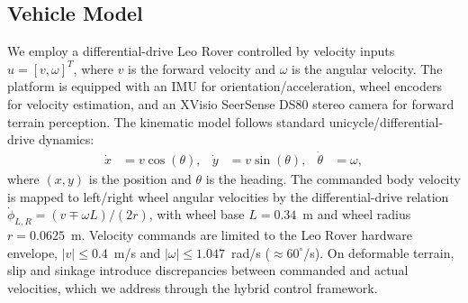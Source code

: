 \documentclass[conference]{IEEEtran}
\begin{document}
\subsection{Vehicle Model}
We employ a differential-drive Leo Rover controlled by velocity inputs $u = [v, \omega]^T$, where $v$ is the forward velocity and $\omega$ is the angular velocity. The platform is equipped with an IMU for orientation/acceleration, wheel encoders for velocity estimation, and an XVisio SeerSense DS80 stereo camera for forward terrain perception. The kinematic model follows standard unicycle/differential-drive dynamics:
\begin{align}
\dot{x} &= v \cos(\theta), &
\dot{y} &= v \sin(\theta), &
\dot{\theta} &= \omega,
\end{align}
where $(x, y)$ is the position and $\theta$ is the heading. The commanded body velocity is mapped to left/right wheel angular velocities by the differential-drive relation $\dot{\phi}_{L,R} = (v \mp \omega L)/(2r)$, with wheel base $L = 0.34$~m and wheel radius $r = 0.0625$~m. Velocity commands are limited to the Leo Rover hardware envelope, $|v| \le 0.4$~m/s and $|\omega| \le 1.047$~rad/s ($\approx 60^\circ$/s). On deformable terrain, slip and sinkage introduce discrepancies between commanded and actual velocities, which we address through the hybrid control framework.
\end{document}
